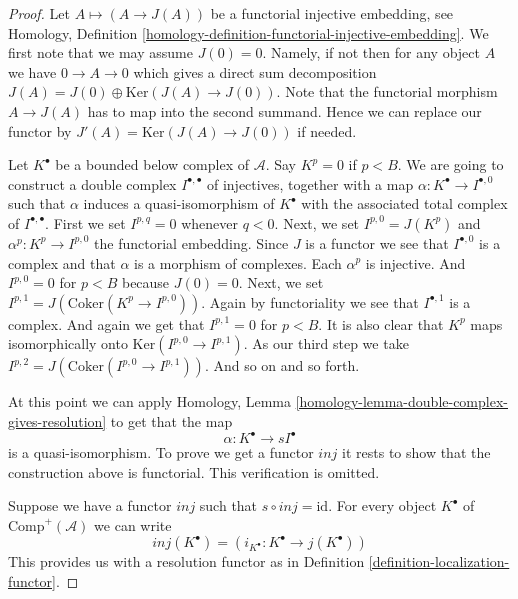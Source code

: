 \begin{proof}
Let $A \mapsto (A \to J(A))$ be a functorial injective embedding, see
Homology, Definition \ref{homology-definition-functorial-injective-embedding}.
We first note that we may assume $J(0) = 0$. Namely, if not then
for any object $A$ we have $0 \to A \to 0$ which gives
a direct sum decomposition $J(A) = J(0) \oplus \text{Ker}(J(A) \to J(0))$.
Note that the functorial morphism $A \to J(A)$ has to map
into the second summand. Hence we can replace our functor
by $J'(A) = \text{Ker}(J(A) \to J(0))$ if needed.

\medskip\noindent
Let $K^\bullet$ be a bounded below complex of $\mathcal{A}$.
Say $K^p = 0$ if $p < B$.
We are going to construct a double complex $I^{\bullet, \bullet}$
of injectives, together with a map $\alpha : K^\bullet \to I^{\bullet, 0}$
such that $\alpha$ induces a quasi-isomorphism of $K^\bullet$
with the associated total complex of $I^{\bullet, \bullet}$.
First we set $I^{p, q} = 0$ whenever $q < 0$.
Next, we set $I^{p, 0} = J(K^p)$ and $\alpha^p : K^p \to I^{p, 0}$
the functorial embedding. Since $J$ is a functor we see that
$I^{\bullet, 0}$ is a complex and that $\alpha$ is a
morphism of complexes. Each $\alpha^p$ is injective. And
$I^{p, 0} = 0$ for $p < B$ because $J(0) = 0$. Next, we set
$I^{p, 1} = J(\text{Coker}(K^p \to I^{p, 0}))$. Again by functoriality
we see that $I^{\bullet, 1}$ is a complex. And again we get
that $I^{p, 1} = 0$ for $p < B$. It is also clear that
$K^p$ maps isomorphically onto $\text{Ker}(I^{p, 0} \to I^{p, 1})$.
As our third step we take $I^{p, 2} = J(\text{Coker}(I^{p, 0} \to I^{p, 1}))$.
And so on and so forth.

\medskip\noindent
At this point we can apply
Homology, Lemma \ref{homology-lemma-double-complex-gives-resolution}
to get that the map
$$
\alpha : K^\bullet \to sI^\bullet
$$
is a quasi-isomorphism. To prove we get a functor $inj$ it
rests to show that the construction above
is functorial. This verification is omitted.

\medskip\noindent
Suppose we have a functor $inj$ such that $s \circ inj = \text{id}$.
For every object $K^\bullet$ of $\text{Comp}^{+}(\mathcal{A})$
we can write
$$
inj(K^\bullet) = (i_{K^\bullet} : K^\bullet \to j(K^\bullet))
$$
This provides us with a resolution functor as in
Definition \ref{definition-localization-functor}.
\end{proof}

